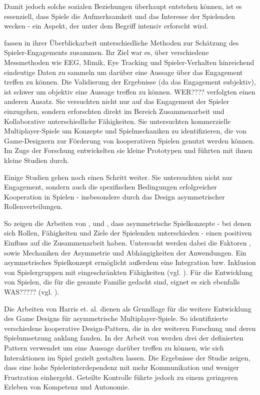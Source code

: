 Damit jedoch solche sozialen Beziehungen überhaupt entstehen können, ist es essenziell, dass Spiele die Aufmerksamkeit und das Interesse der Spielenden wecken - ein Aspekt, der unter dem Begriff  intensiv erforscht wird.

\cite{rashed_review_2025} fassen in ihrer Überblickarbeit unterschiedliche Methoden zur Schätzung des Spieler-Engagements zusammen. Ihr Ziel war es, über verschiedene Messmethoden wie EEG, Mimik, Eye Tracking und Spieler-Verhalten hinreichend eindeutige Daten zu sammeln um darüber eine Aussage über das Engagement treffen zu können. Die Validierung der Ergebnisse (da das Engagement subjektiv), ist schwer um objektiv eine  Aussage treffen zu können. \cite{yu_video_2023} WER???? verfolgten einen anderen Ansatz. Sie versuchten nicht nur auf das Engagement der Spieler einzugehen, sondern erforschten direkt im Bereich Zusammenarbeit und Kollaborative unterschiedliche Fähigkeiten. Sie untersuchten kommerzielle Multiplayer-Spiele um Konzepte und Spielmechaniken zu identifizieren, die von Game-Designern zur Förderung von kooperativen Spielen genutzt werden können. Im Zuge der Forschung entwickelten sie kleine Prototypen und führten mit ihnen kleine Studien durch. 

Einige Studien gehen noch einen Schritt weiter. Sie untersuchten nicht nur Engagement, sondern auch die spezifischen Bedingungen erfolgreicher Kooperation in Spielen - insbesondere durch das Design asymmetrischer Rollenverteilungen.

So zeigen die Arbeiten von \cite{harris_beam_2014}, \cite{harris_leveraging_2016} und \cite{harris_asymmetry_2019}, dass asymmetrische Spielkonzepte - bei denen sich Rollen, Fähigkeiten und Ziele der Spielenden unterschieden - einen positiven Einfluss auf die Zusammenarbeit haben. Untersucht werden dabei die Faktoren ,  sowie Mechaniken der Asymmetrie und Abhängigkeiten der Anwendungen. Ein asymmetrisches Spielkonzept ermöglicht außerdem eine Integration bzw. Inklusion von Spielergruppen mit eingeschränkten Fähigkeiten (vgl. \cite{goncalves_exploring_2021}). Für die Entwicklung von Spielen, die für die gesamte Familie gedacht sind, eignet es sich ebenfalls WAS????? (vgl. \cite{pais_promoting_2024}).

Die Arbeiten von Harris et. al. dienen als Grundlage für die weitere Entwicklung des Game Designs für asymmetrische Multiplayer-Spiele. So identifizierte \cite{guimaraes_rocha_game_2008} verschiedene kooperative Design-Pattern, die in der weiteren Forschung und deren Spielumsetzung anklang fanden. In der Arbeit von \cite{emmerich_impact_2017} werden drei der definierten Pattern verwendet um eine Aussage darüber treffen zu können, wie sich Interaktionen im Spiel gezielt gestalten lassen. Die Ergebnisse der Studie zeigen, dass eine hohe Spielerinterdependenz mit mehr Kommunikation und weniger Frustration einhergeht. Geteilte Kontrolle führte jedoch zu einem geringeren Erleben von Kompetenz und Autonomie.

